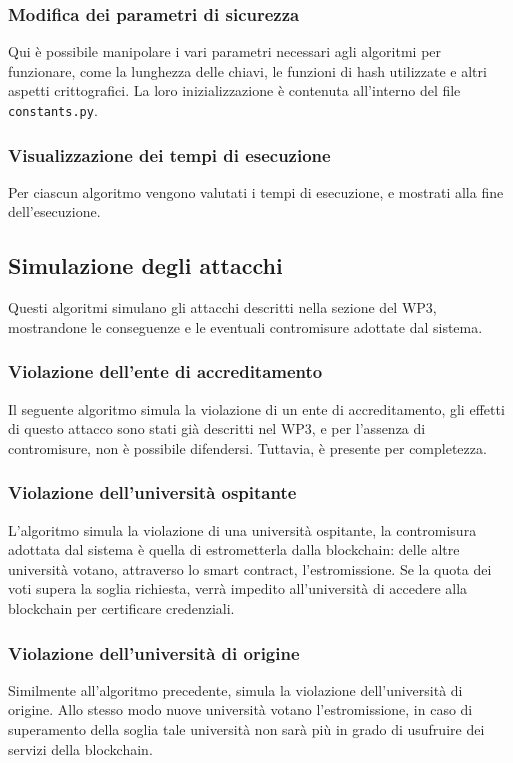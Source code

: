\documentclass[a4paper,12pt]{article}
\begin{document}
\subsubsection{Modifica dei parametri di sicurezza}
Qui è possibile manipolare i vari parametri necessari agli algoritmi per funzionare, come la lunghezza delle chiavi, le funzioni di hash utilizzate e altri aspetti crittografici. La loro inizializzazione è contenuta all'interno del file \texttt{constants.py}.
\subsubsection{Visualizzazione dei tempi di esecuzione}
Per ciascun algoritmo vengono valutati i tempi di esecuzione, e mostrati alla fine dell'esecuzione.
\subsection{Simulazione degli attacchi}
Questi algoritmi simulano gli attacchi descritti nella sezione del WP3, mostrandone le conseguenze e le eventuali contromisure adottate dal sistema.
\subsubsection{Violazione dell'ente di accreditamento}
Il seguente algoritmo simula la violazione di un ente di accreditamento, gli effetti di questo attacco sono stati già descritti nel WP3, e per l'assenza di contromisure, non è possibile difendersi. Tuttavia, è presente per completezza.
\subsubsection{Violazione dell'università ospitante}
L'algoritmo simula la violazione di una università ospitante, la contromisura adottata dal sistema è quella di estrometterla dalla blockchain: delle altre università votano, attraverso lo smart contract, l'estromissione. Se la quota dei voti supera la soglia richiesta, verrà impedito all'università di accedere alla blockchain per certificare credenziali.
\subsubsection{Violazione dell'università di origine}
Similmente all'algoritmo precedente, simula la violazione dell'università di origine. Allo stesso modo nuove università votano l'estromissione, in caso di superamento della soglia tale università non sarà più in grado di usufruire dei servizi della blockchain.
\end{document}
